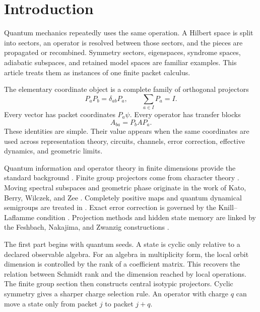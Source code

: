 \section{Introduction}\label{strong:section:001}\label{strong:sec:introduction}

Quantum mechanics repeatedly uses the same operation. A Hilbert space is split into sectors, an operator is resolved between those sectors, and the pieces are propagated or recombined. Symmetry sectors, eigenspaces, syndrome spaces, adiabatic subspaces, and retained model spaces are familiar examples. This article treats them as instances of one finite packet calculus.

The elementary coordinate object is a complete family of orthogonal projectors
\[
P_aP_b=\delta_{ab}P_a,
\qquad
\sum_{a\in I}P_a=I.
\]
Every vector has packet coordinates \(P_a\psi\). Every operator has transfer blocks
\[
A_{ba}=P_bAP_a.
\]
These identities are simple. Their value appears when the same coordinates are used across representation theory, circuits, channels, error correction, effective dynamics, and geometric limits.

Quantum information and operator theory in finite dimensions provide the standard background \cite{NielsenChuang2010,Watrous2018,Bhatia1997}. Finite group projectors come from character theory \cite{Serre1977,FultonHarris1991}. Moving spectral subspaces and geometric phase originate in the work of Kato, Berry, Wilczek, and Zee \cite{Kato1950,Kato1995,Berry1984,WilczekZee1984}. Completely positive maps and quantum dynamical semigroups are treated in \cite{Stinespring1955,Choi1975,Kraus1983,Lindblad1976}. Exact error correction is governed by the Knill--Laflamme condition \cite{KnillLaflamme1997,SchumacherNielsen1996,BenyKempfKribs2007}. Projection methods and hidden state memory are linked by the Feshbach, Nakajima, and Zwanzig constructions \cite{Feshbach1958,Nakajima1958,Zwanzig1960,BravyiDiVincenzoLoss2011}.

The first part begins with quantum seeds. A state is cyclic only relative to a declared observable algebra. For an algebra in multiplicity form, the local orbit dimension is controlled by the rank of a coefficient matrix. This recovers the relation between Schmidt rank and the dimension reached by local operations. The finite group section then constructs central isotypic projectors. Cyclic symmetry gives a sharper charge selection rule. An operator with charge \(q\) can move a state only from packet \(j\) to packet \(j+q\).

